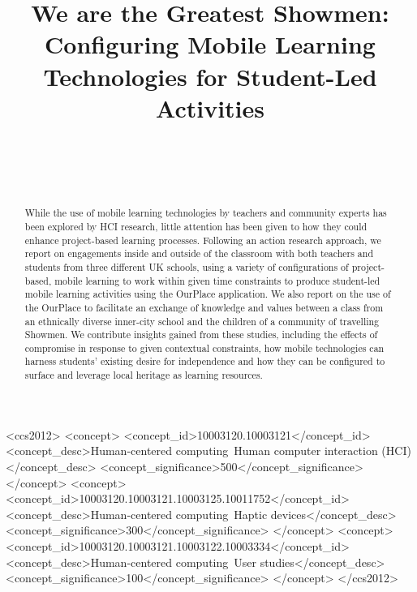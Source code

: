 \documentclass[,hyphens]{sigchi}
\begin{document}
\title{We are the Greatest Showmen: Configuring Mobile Learning Technologies for Student-Led Activities}

\author{%
  \\
  \\
  \\
}

\maketitle

\begin{abstract}
While the use of mobile learning technologies by teachers and community experts has been explored by HCI research, little attention has been given to how they could enhance project-based learning processes. Following an action research approach, we report on engagements inside and outside of the classroom with both teachers and students from three different UK schools, using a variety of configurations of project-based, mobile learning to work within given time constraints to produce student-led mobile learning activities using the OurPlace application. We also report on the use of the OurPlace to facilitate an exchange of knowledge and values between a class from an ethnically diverse inner-city school and the children of a community of travelling Showmen. We contribute insights gained from these studies, including the effects of compromise in response to given contextual constraints, how mobile technologies can harness students' existing desire for independence and how they can be configured to surface and leverage local heritage as learning resources.
\end{abstract}



\begin{CCSXML}
<ccs2012>
<concept>
<concept_id>10003120.10003121</concept_id>
<concept_desc>Human-centered computing~Human computer interaction (HCI)</concept_desc>
<concept_significance>500</concept_significance>
</concept>
<concept>
<concept_id>10003120.10003121.10003125.10011752</concept_id>
<concept_desc>Human-centered computing~Haptic devices</concept_desc>
<concept_significance>300</concept_significance>
</concept>
<concept>
<concept_id>10003120.10003121.10003122.10003334</concept_id>
<concept_desc>Human-centered computing~User studies</concept_desc>
<concept_significance>100</concept_significance>
</concept>
</ccs2012>
\end{CCSXML}
\end{document}
